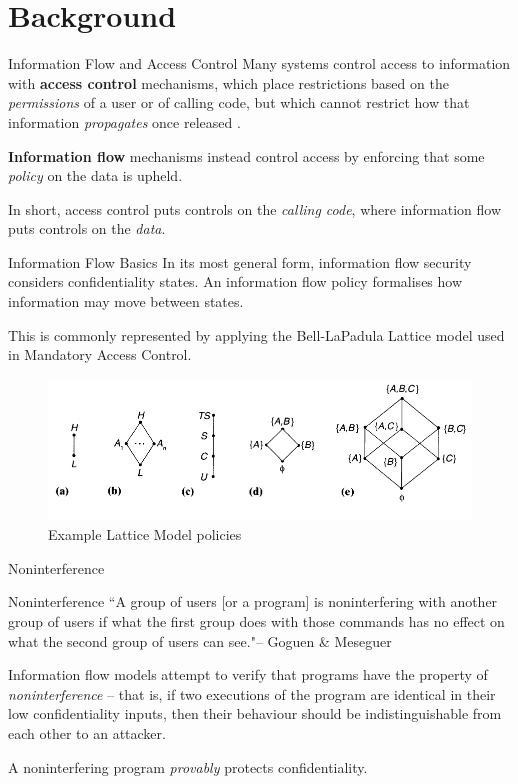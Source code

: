 \section{Background}

\begin{frame}{Information Flow and Access Control}
	Many systems control access to information with \textbf{access control} mechanisms, which place restrictions based on the \textit{permissions} of a user or of calling code, but which cannot restrict how that information \textit{propagates} once released \cite{ifbackground:sabelfeld}.
	
	\textbf{Information flow} mechanisms instead control access by enforcing that some \textit{policy} on the data is upheld.
	
	In short, access control puts controls on the \textit{calling code}, where information flow puts controls on the \textit{data}.
\end{frame}

\begin{frame}{Information Flow Basics}
	In its most general form, information flow security considers confidentiality states. An information flow policy formalises how information may move between states.
	
	This is commonly represented by applying the Bell-LaPadula Lattice model used in Mandatory Access Control.
	
	\begin{figure}
		\includegraphics[scale=0.45]{content/images/lattice_examples.png}
		\caption{Example Lattice Model policies \cite{ifbackground:sandhu}}
	\end{figure}
	
\end{frame}

\begin{frame}{Noninterference}
	\begin{block}{Noninterference}
		``A group of users [or a program] is noninterfering with another group of users if what the first group does with those commands has no effect on what the second group of users can see."\newline \tiny{-- Goguen \& Meseguer} \cite{ifbackground:goguen}
	\end{block}
	
	Information flow models attempt to verify that programs have the property of \textit{noninterference} -- that is, if two executions of the program are identical in their low confidentiality inputs, then their behaviour should be indistinguishable from each other to an attacker.
	
	A noninterfering program \textit{provably} protects confidentiality.
\end{frame}

